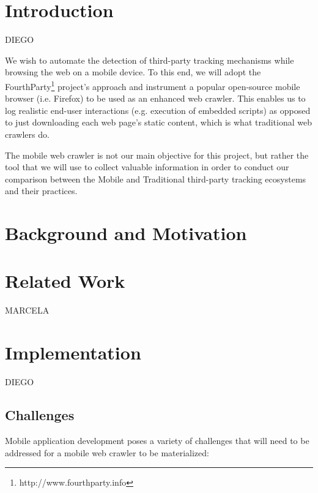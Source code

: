 \documentclass{acm_proc_article-sp}
\begin{document}


\section{Introduction}
DIEGO

We wish to automate the detection of third-party tracking mechanisms while browsing the web on a mobile device. To this end, we will adopt the FourthParty\footnote{http://www.fourthparty.info} project's approach and instrument a popular open-source mobile browser (i.e. Firefox) to be used as an enhanced web crawler. This enables us to log realistic end-user interactions (e.g. execution of embedded scripts) as opposed to just downloading each web page's static content, which is what traditional web crawlers do.

The mobile web crawler is not our main objective for this project, but rather the tool that we will use to collect valuable information in order to conduct our comparison between the Mobile and Traditional third-party tracking ecosystems and their practices.


\section{Background and Motivation}

\section{Related Work}
MARCELA

\section{Implementation}
DIEGO

\subsection{Challenges}
Mobile application development poses a variety of challenges that will need to be addressed for a mobile web crawler to be materialized:
\end{document}
